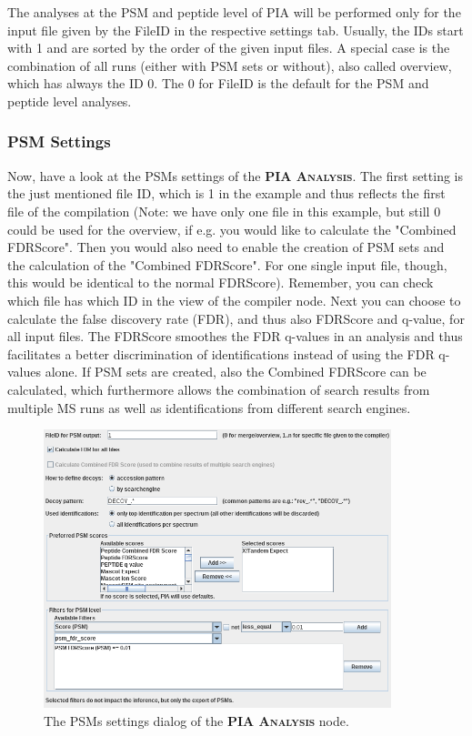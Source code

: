 \documentclass[a4paper,11pt,twoside]{article}
\newcommand{\knimenode}[1]{{\scshape\bfseries #1}}
\begin{document}
The analyses at the PSM and peptide level of PIA will be performed only for the
input file given by the FileID in the respective settings tab. Usually, the IDs
start with 1 and are sorted by the order of the given input files. A special
case is the combination of all runs (either with PSM sets or without), also
called overview, which has always the ID 0. The 0 for FileID is the default for
the PSM and peptide level analyses.


\subsubsection{PSM Settings}

Now, have a look at the PSMs settings of the \knimenode{PIA Analysis}. The
first setting is the just mentioned file ID, which is 1 in the example and thus
reflects the first file of the compilation (Note: we have only one file in this
example, but still 0 could be used for the overview, if e.g. you would like to
calculate the "Combined FDRScore". Then you would also need to enable the
creation of PSM sets and the calculation of the "Combined FDRScore". For one
single input file, though, this would be identical to the normal FDRScore).
Remember, you can check which file has which ID in the view of the compiler
node. Next you can choose to calculate the false discovery rate (FDR), and thus
also FDRScore and q-value, for all input files. The FDRScore \cite{jones2009}
smoothes the FDR q-values in an analysis and thus facilitates a better
discrimination of identifications instead of using the FDR q-values alone. If
PSM sets are created, also the Combined FDRScore can be calculated, which
furthermore allows the combination of search results from multiple MS runs as
well as identifications from different search engines.

\begin{figure}[ht!]
	\centering
	\includegraphics[width=0.9\textwidth]{graphics/pia_settings_psms}
	\caption{The PSMs settings dialog of the \knimenode{PIA Analysis} node.}
	\label{pia_settings_psms}
\end{figure}
\end{document}
